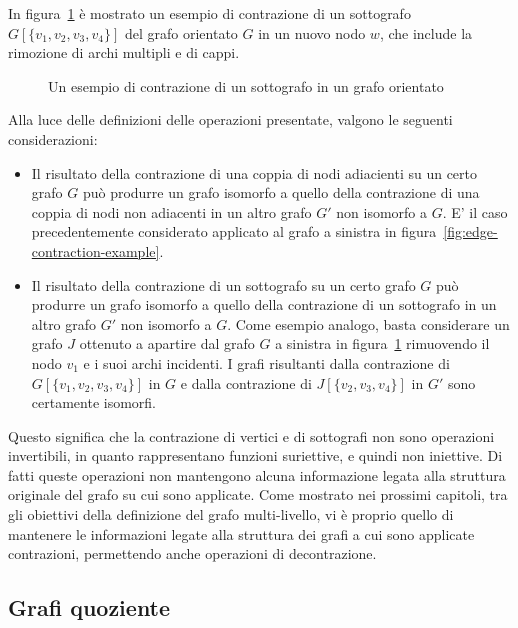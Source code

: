 In figura~\ref{fig:subgraph-contraction-example} \`e mostrato un esempio di contrazione di un sottografo
$G[\{v_1, v_2, v_3, v_4\}]$ del grafo orientato $G$ in un nuovo nodo $w$, che include la rimozione di archi multipli
e di cappi. \newline

\begin{figure}[h]
    \centering
    
    \caption{Un esempio di contrazione di un sottografo in un grafo orientato}
    \label{fig:subgraph-contraction-example}
\end{figure}

Alla luce delle definizioni delle operazioni presentate, valgono le seguenti considerazioni:
\begin{itemize}
    \item Il risultato della contrazione di una coppia di nodi adiacienti su un certo grafo $G$ pu\`o produrre un
    grafo isomorfo a quello della contrazione di una coppia di nodi non adiacenti in un altro grafo $G'$ non isomorfo
    a $G$.
    E' il caso precedentemente considerato applicato al grafo a sinistra in figura~\ref{fig:edge-contraction-example}.
    \item Il risultato della contrazione di un sottografo su un certo grafo $G$ pu\`o produrre un grafo isomorfo
    a quello della contrazione di un sottografo in un altro grafo $G'$ non isomorfo a $G$.
    Come esempio analogo, basta considerare un grafo $J$ ottenuto a apartire dal grafo $G$ a sinistra in
    figura~\ref{fig:subgraph-contraction-example} rimuovendo il nodo $v_1$ e i suoi archi incidenti.
    I grafi risultanti dalla contrazione di $G[\{v_1, v_2, v_3, v_4\}]$ in $G$ e dalla contrazione di
    $J[\{v_2, v_3, v_4\}]$ in $G'$ sono certamente isomorfi.
\end{itemize}

Questo significa che la contrazione di vertici e di sottografi non sono operazioni invertibili, in quanto
rappresentano funzioni suriettive, e quindi non iniettive.
Di fatti queste operazioni non mantengono alcuna informazione legata alla struttura originale del grafo su cui
sono applicate.
Come mostrato nei prossimi capitoli, tra gli obiettivi della definizione del grafo multi-livello, vi \`e proprio
quello di mantenere le informazioni legate alla struttura dei grafi a cui sono applicate contrazioni, permettendo
anche operazioni di decontrazione.

\subsection{Grafi quoziente}\label{subsec:grafi-quoziente}

